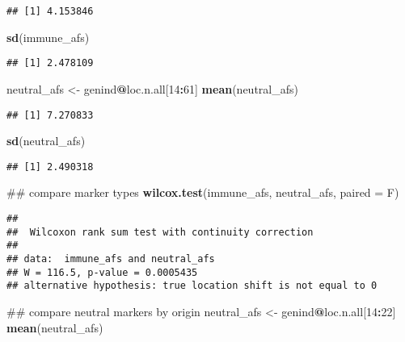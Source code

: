 \documentclass[]{article}
\newenvironment{Shaded}{\begin{snugshade}}{\end{snugshade}}
\newcommand{\KeywordTok}[1]{\textcolor[rgb]{0.13,0.29,0.53}{\textbf{#1}}}
\newcommand{\DataTypeTok}[1]{\textcolor[rgb]{0.13,0.29,0.53}{#1}}
\newcommand{\DecValTok}[1]{\textcolor[rgb]{0.00,0.00,0.81}{#1}}
\newcommand{\StringTok}[1]{\textcolor[rgb]{0.31,0.60,0.02}{#1}}
\newcommand{\OperatorTok}[1]{\textcolor[rgb]{0.81,0.36,0.00}{\textbf{#1}}}
\newcommand{\NormalTok}[1]{#1}
\begin{document}
\begin{verbatim}
## [1] 4.153846
\end{verbatim}

\begin{Shaded}
\begin{Highlighting}[]
\KeywordTok{sd}\NormalTok{(immune_afs)}
\end{Highlighting}
\end{Shaded}

\begin{verbatim}
## [1] 2.478109
\end{verbatim}

\begin{Shaded}
\begin{Highlighting}[]
\NormalTok{neutral_afs <-}\StringTok{ }\NormalTok{genind}\OperatorTok{@}\NormalTok{loc.n.all[}\DecValTok{14}\OperatorTok{:}\DecValTok{61}\NormalTok{]}
\KeywordTok{mean}\NormalTok{(neutral_afs)}
\end{Highlighting}
\end{Shaded}

\begin{verbatim}
## [1] 7.270833
\end{verbatim}

\begin{Shaded}
\begin{Highlighting}[]
\KeywordTok{sd}\NormalTok{(neutral_afs)}
\end{Highlighting}
\end{Shaded}

\begin{verbatim}
## [1] 2.490318
\end{verbatim}

\begin{Shaded}
\begin{Highlighting}[]
\NormalTok{## compare marker types}
\KeywordTok{wilcox.test}\NormalTok{(immune_afs, neutral_afs, }\DataTypeTok{paired =}\NormalTok{ F)}
\end{Highlighting}
\end{Shaded}

\begin{verbatim}
## 
##  Wilcoxon rank sum test with continuity correction
## 
## data:  immune_afs and neutral_afs
## W = 116.5, p-value = 0.0005435
## alternative hypothesis: true location shift is not equal to 0
\end{verbatim}

\begin{Shaded}
\begin{Highlighting}[]
\NormalTok{## compare neutral markers by origin}
\NormalTok{neutral_afs <-}\StringTok{ }\NormalTok{genind}\OperatorTok{@}\NormalTok{loc.n.all[}\DecValTok{14}\OperatorTok{:}\DecValTok{22}\NormalTok{]}
\KeywordTok{mean}\NormalTok{(neutral_afs)}
\end{Highlighting}
\end{Shaded}
\end{document}
